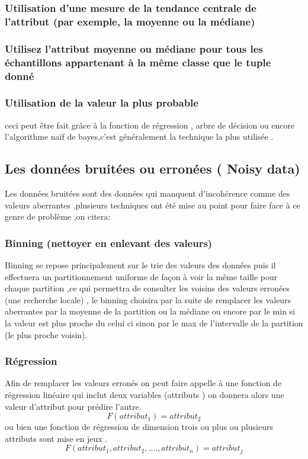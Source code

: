 \documentclass[12pt,a4paper,oneside]{book}
\begin{document}
    \subsubsection{Utilisation d'une mesure de la tendance centrale de l’attribut (par exemple, la moyenne ou la médiane)}
    \subsubsection{Utilisez l'attribut moyenne ou médiane pour tous les échantillons appartenant à la même classe que
    le tuple donné }
    \subsubsection{Utilisation de la valeur la plus probable}
    ceci peut être fait grâce à la fonction de régression  , arbre de décision ou encore  l'algorithme naïf de bayes,c'est généralement la technique la plus utilisée  .
    
    
    \subsection{Les données bruitées ou erronées ( Noisy data)}
     Les données bruitées sont des données qui manquent d'incohérence comme des valeurs aberrantes ,plusieurs techniques ont été mise au point pour faire face à ce genre de problème ,on citera:
    \subsubsection{Binning (nettoyer en enlevant des valeurs)}
	    Binning se repose principalement sur le trie des valeurs des données puis il effectuera un partitionnement uniforme  de façon à voir la même taille pour chaque partition ,ce qui permettra de consulter les voisins des valeurs erronées (une recherche locale) , le binning choisira par la suite de remplacer les valeurs aberrantes par la moyenne de la partition ou la médiane ou encore par le min si la valeur est plus proche du celui ci sinon par le max de l'intervalle de la  partition (le plus proche voisin).
	    
	    \subsubsection{Régression}
	     Afin de remplacer les valeurs erronés on peut faire appelle à une fonction de régression linéaire 
	    qui inclut deux variables (attributs ) on donnera alors une valeur d'attribut pour prédire l'autre.
	      \begin{equation*}
	    	      F(attribut_1)=attribut_2
	    	      \end{equation*}
	     ou bien une fonction de régression de dimension trois ou plus ou plusieurs attributs sont mise en jeux .
	       \begin{equation*}
	     	      F(attribut_1,attribut_2,....,attribut_n)=attribut_j  \end{equation*}
\end{document}
